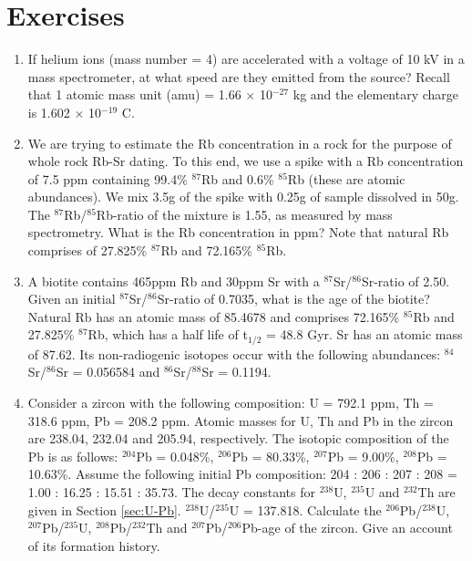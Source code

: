 \chapter{Exercises}
\label{ch:exercises}

\begin{enumerate}

\item If helium ions (mass number = 4) are accelerated with a voltage
  of 10 kV in a mass spectrometer, at what speed are they emitted from
  the source? Recall that 1 atomic mass unit (amu) = 1.66 $\times$
  10$^{-27}$ kg and the elementary charge is 1.602 $\times$ 10$^{-19}$
  C. 

\item We are trying to estimate the Rb concentration in a rock for the
  purpose of whole rock Rb-Sr dating. To this end, we use a spike with
  a Rb concentration of 7.5 ppm containing 99.4\% $^{87}$Rb and 0.6\%
  $^{85}$Rb (these are atomic abundances). We mix 3.5g of the spike
  with 0.25g of sample dissolved in 50g. The $^{87}$Rb/$^{85}$Rb-ratio
  of the mixture is 1.55, as measured by mass spectrometry. What is
  the Rb concentration in ppm? Note that natural Rb comprises of
  27.825\% $^{87}$Rb and 72.165\% $^{85}$Rb.  

\item A biotite contains 465ppm Rb and 30ppm Sr with a
  $^{87}$Sr/$^{86}$Sr-ratio of 2.50.  Given an initial
  $^{87}$Sr/$^{86}$Sr-ratio of 0.7035, what is the age of the biotite?
  Natural Rb has an atomic mass of 85.4678 and comprises 72.165\%
  $^{85}$Rb and 27.825\% $^{87}$Rb, which has a half life of t$_{1/2}$
  = 48.8 Gyr. Sr has an atomic mass of 87.62. Its non-radiogenic
  isotopes occur with the following abundances: $^{84}$Sr/$^{86}$Sr =
  0.056584 and $^{86}$Sr/$^{88}$Sr = 0.1194.

\item Consider a zircon with the following composition: U = 792.1 ppm,
  Th = 318.6 ppm, Pb = 208.2 ppm. Atomic masses for U, Th and Pb in
  the zircon are 238.04, 232.04 and 205.94, respectively. The isotopic
  composition of the Pb is as follows: $^{204}$Pb = 0.048\%,
  $^{206}$Pb = 80.33\%, $^{207}$Pb = 9.00\%, $^{208}$Pb =
  10.63\%. Assume the following initial Pb composition: 204 : 206 :
  207 : 208 = 1.00 : 16.25 : 15.51 : 35.73. The decay constants for
  $^{238}$U, $^{235}$U and $^{232}$Th are given in Section
  \ref{sec:U-Pb}. $^{238}$U/$^{235}$U = 137.818. Calculate the
  $^{206}$Pb/$^{238}$U, $^{207}$Pb/$^{235}$U, $^{208}$Pb/$^{232}$Th
  and $^{207}$Pb/$^{206}$Pb-age of the zircon. Give an account of its
  formation history. \\ 


\end{enumerate}
